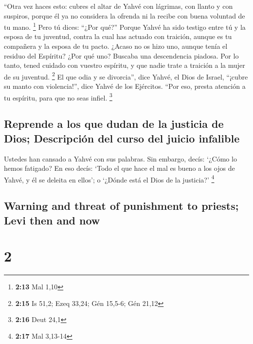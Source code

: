 \begin{paracol}{2}
 ``Otra vez haces esto: cubres el altar de Yahvé con
lágrimas, con llanto y con suspiros, porque él ya no considera la
ofrenda ni la recibe con buena voluntad de tu mano. \footnote{\textbf{2:13}
  Mal 1,10}  Pero tú dices: ``¿Por qué?'' Porque Yahvé ha
sido testigo entre tú y la esposa de tu juventud, contra la cual has
actuado con traición, aunque es tu compañera y la esposa de tu pacto.
 ¿Acaso no os hizo uno, aunque tenía el residuo del
Espíritu? ¿Por qué uno? Buscaba una descendencia piadosa. Por lo tanto,
tened cuidado con vuestro espíritu, y que nadie trate a traición a la
mujer de su juventud. \footnote{\textbf{2:15} Is 51,2; Ezeq 33,24; Gén
  15,5-6; Gén 21,12}  El que odia y se divorcia'', dice
Yahvé, el Dios de Israel, ``¡cubre su manto con violencia!'', dice Yahvé
de los Ejércitos. ``Por eso, presta atención a tu espíritu, para que no
seas infiel. \footnote{\textbf{2:16} Deut 24,1}

\hypertarget{reprende-a-los-que-dudan-de-la-justicia-de-dios-descripciuxf3n-del-curso-del-juicio-infalible}{%
\subsection{Reprende a los que dudan de la justicia de Dios; Descripción
del curso del juicio
infalible}\label{reprende-a-los-que-dudan-de-la-justicia-de-dios-descripciuxf3n-del-curso-del-juicio-infalible}}

 Ustedes han cansado a Yahvé con sus palabras. Sin
embargo, decís: `¿Cómo lo hemos fatigado? En eso decís: `Todo el que
hace el mal es bueno a los ojos de Yahvé, y él se deleita en ellos'; o
`¿Dónde está el Dios de la justicia?' \footnote{\textbf{2:17} Mal
  3,13-14}

\switchcolumn
\begin{otherlanguage}{english}

\hypertarget{warning-and-threat-of-punishment-to-priests-levi-then-and-now}{%
\subsection{Warning and threat of punishment to priests; Levi then and
now}\label{warning-and-threat-of-punishment-to-priests-levi-then-and-now}}

\hypertarget{section-3}{%
\section{2}\label{section-3}}


\end{otherlanguage}
\end{paracol}
